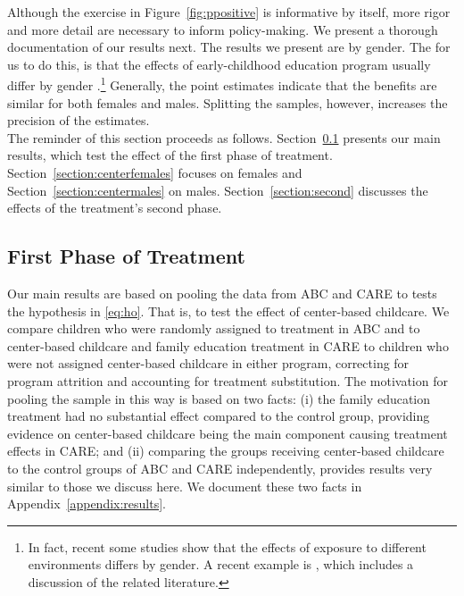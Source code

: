 \noindent Although the exercise in Figure~\ref{fig:ppositive} is informative by itself, more rigor and more detail are necessary to inform policy-making. We present a thorough documentation of our results next. The results we present are by gender. The for us to do this, is that the effects of early-childhood education program usually differ by gender \citep{Heckman_Moon_etal_2010_QE,Campbell_Conti_etal_2014_EarlyChildhoodInvestments}.\footnote{In fact, recent some studies show that the effects of exposure to different environments differs by gender. A recent example is \citet{Autor-etal_2015_Family-Disadvantage}, which includes a discussion of the related literature.} Generally, the point estimates indicate that the benefits are similar for both females and males. Splitting the samples, however, increases the precision of the estimates.\\

\noindent The reminder of this section proceeds as follows. Section~\ref{section:center} presents our main results, which test the effect of the first phase of treatment. Section~\ref{section:centerfemales} focuses on females and Section~\ref{section:centermales} on males. Section~\ref{section:second} discusses the effects of the treatment's second phase.\\

\subsection{First Phase of Treatment} \label{section:center}

\noindent Our main results are based on pooling the data from ABC and CARE to tests the hypothesis in \eqref{eq:ho}. That is, to test the effect of center-based childcare. We compare children who were randomly assigned to treatment in ABC and to center-based childcare and family education treatment in CARE to children who were not assigned center-based childcare in either program, correcting for program attrition and accounting for treatment substitution. The motivation for pooling the sample in this way is based on two facts: (i) the family education treatment had no substantial effect compared to the control group, providing evidence on center-based childcare being the main component causing treatment effects in CARE; and (ii) comparing the groups receiving center-based childcare to the control groups of ABC and CARE independently, provides results very similar to those we discuss here. We document these two facts in Appendix~\ref{appendix:results}.\\

